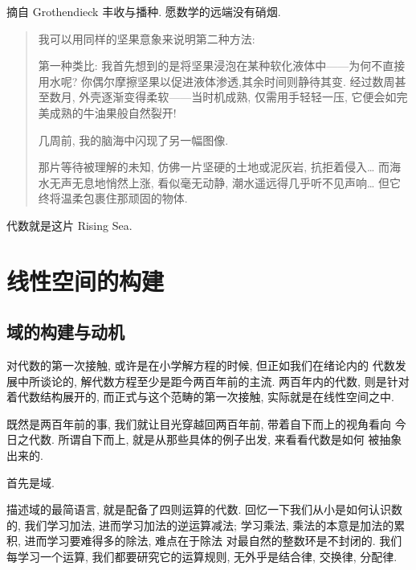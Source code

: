 \documentclass[UTF8]{book}
\begin{document}
\vspace*{5em}

摘自 Grothendieck 丰收与播种. 愿数学的远端没有硝烟. 

\begin{quotation}
    
    \kaishu   
    我可以用同样的坚果意象来说明第二种方法: 
    
    第一种类比: 
    我首先想到的是将坚果浸泡在某种软化液体中——为何不直接用水呢? 
    你偶尔摩擦坚果以促进液体渗透,其余时间则静待其变. 
    经过数周甚至数月, 外壳逐渐变得柔软——当时机成熟, 仅需用手轻轻一压, 
    它便会如完美成熟的牛油果般自然裂开! 

    几周前, 我的脑海中闪现了另一幅图像. 
      
    那片等待被理解的未知, 仿佛一片坚硬的土地或泥灰岩, 抗拒着侵入\dots
    而海水无声无息地悄然上涨, 看似毫无动静, 潮水遥远得几乎听不见声响\dots 
    但它终将温柔包裹住那顽固的物体. 
    
\end{quotation}

代数就是这片 Rising Sea. 

\setcounter{chapter}{4}
\chapter{线性空间的构建}

\section{域的构建与动机}

对代数的第一次接触, 或许是在小学解方程的时候, 但正如我们在绪论内的
代数发展中所谈论的, 
解代数方程至少是距今两百年前的主流. 
两百年内的代数, 则是针对着代数结构展开的, 
而正式与这个范畴的第一次接触, 实际就是在线性空间之中. 

既然是两百年前的事, 我们就让目光穿越回两百年前, 带着自下而上的视角看向
今日之代数. 所谓自下而上, 就是从那些具体的例子出发, 来看看代数是如何
被抽象出来的. 

首先是域. 

描述域的最简语言, 就是配备了四则运算的代数. 
回忆一下我们从小是如何认识数的, 我们学习加法, 进而学习加法的逆运算减法; 
学习乘法, 乘法的本意是加法的累积, 进而学习要难得多的除法, 难点在于除法
对最自然的整数环是不封闭的. 
我们每学习一个运算, 我们都要研究它的运算规则, 无外乎是结合律, 交换律, 
分配律. 
\end{document}
